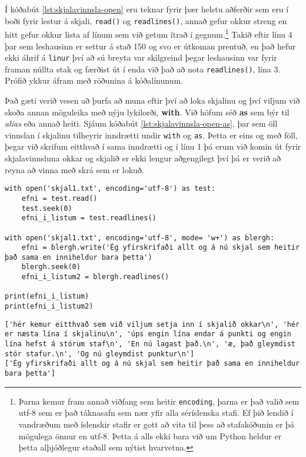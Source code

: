 Í kóðabút \ref{lst:skjalavinnsla-open} eru teknar fyrir þær helstu aðferðir sem eru í boði fyrir lestur á skjali, \texttt{read()} og \texttt{readlines()}, annað gefur okkur streng en hitt gefur okkur lista af línum sem við getum ítrað í gegnum.\footnote{Þarna kemur fram annað viðfang sem heitir \texttt{encoding}, þarna er það valið sem utf-8 sem er það táknasafn sem nær yfir alla séríslenska stafi.
Ef þið lendið í vandræðum með íslenskir stafir er gott að vita til þess að stafakóðunin er þá mögulega önnur en utf-8. Þetta á alls ekki bara við um Python heldur er þetta alþjóðlegur staðall sem nýtist hvarvetna.}
Takið eftir línu 4 þar sem leshausinn er settur á stað 150 og svo er útkoman prentuð, en það hefur ekki áhrif á \texttt{linur} því að sú breyta var skilgreind þegar leshausinn var fyrir framan núllta stak og færðist út í enda við það að nota \texttt{readlines()}, lína 3.
Prófið ykkur áfram með röðunina á kóðalínunum.
 
Það gæti verið vesen að þurfa að muna eftir því að loka skjalinu og því viljum við skoða annan möguleika með nýju lykilorði, \textbf{with}.
Við höfum séð \textbf{as} sem býr til \textit{alias} eða annað heiti.
Sjáum kóðabút \ref{lst:skjalavinnsla-open-as}, þar sem öll vinnslan í skjalinu tilheyrir inndrætti undir \texttt{with} og \texttt{as}.
Þetta er eins og með föll, þegar við skrifum eitthvað í sama inndrætti og í línu 1 þá erum við komin út fyrir skjalavinnsluna okkar og skjalið er ekki lengur aðgengilegt því þá er verið að reyna að vinna með skrá sem er lokuð.
 
\begin{lstlisting}[caption=Hér sjáum við nýja leið til að opna skjal og loka því sjálfkrafa, label=lst:skjalavinnsla-open-as]
with open('skjal1.txt', encoding='utf-8') as test:
	efni = test.read()
	test.seek(0)
	efni_i_listum = test.readlines()

with open('skjal1.txt', encoding='utf-8', mode= 'w+') as blergh:
	efni = blergh.write('Ég yfirskrifaði allt og á nú skjal sem heitir það sama en inniheldur bara þetta')
	blergh.seek(0)
	efni_i_listum2 = blergh.readlines()

print(efni_i_listum)
print(efni_i_listum2)
\end{lstlisting}
\lstset{style=uttak}
\begin{lstlisting}
['hér kemur eitthvað sem við viljum setja inn í skjalið okkar\n', 'hér er næsta lína í skjalinu\n', 'úps engin lína endar á punkti og engin lína hefst á stórum staf\n', 'En nú lagast það.\n', 'æ, það gleymdist stór stafur.\n', 'Og nú gleymdist punktur\n']
['Ég yfirskrifaði allt og á nú skjal sem heitir það sama en inniheldur bara þetta']
\end{lstlisting}
\lstset{style=venjulegt}


